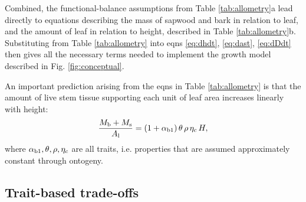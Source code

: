 \documentclass[a4paper,11pt]{article}
\begin{document}
Combined, the functional-balance assumptions from Table \ref{tab:allometry}a lead directly to equations describing the mass of sapwood and bark in relation to leaf, and the amount of leaf in relation to height, described in Table \ref{tab:allometry}b. Substituting from Table \ref{tab:allometry} into eqns \ref{eq:dhdt}, \ref{eq:dast}, \ref{eq:dDdt} then gives all the necessary terms needed to implement the growth model described in Fig. \ref{fig:conceptual}.

An important prediction arising from the eqns in Table \ref{tab:allometry} is that the amount of live stem tissue supporting each unit of leaf area increases linearly with  height:
\begin{equation}\label{eq:msml}
\frac{M_{\rm b} + M_{\rm s}}{A_{\rm l}} = (1+ \alpha_{\rm b1}) \,\theta \, \rho \, \eta_c \, H,
\end{equation}
where $\alpha_{\rm b1}, \theta, \rho, \eta_c$ are all traits, i.e. properties that are assumed approximately constant through ontogeny.

\subsection{Trait-based trade-offs}
\end{document}
